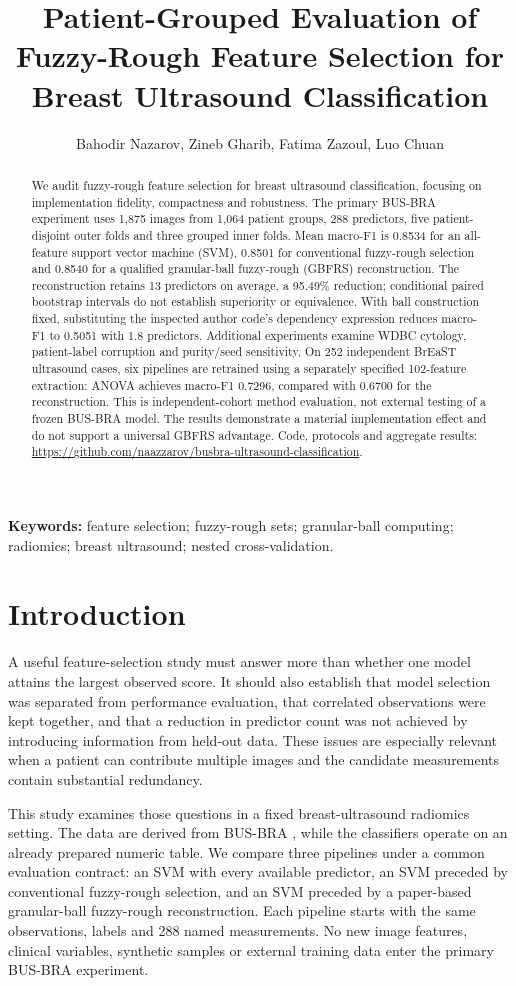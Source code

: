 \documentclass[11pt,a4paper]{article}
\title{Patient-Grouped Evaluation of Fuzzy-Rough Feature Selection for Breast Ultrasound Classification}
\author{Bahodir Nazarov, Zineb Gharib, Fatima Zazoul, Luo Chuan}
\date{}
\makeatletter
\renewcommand{\maketitle}{%
  \begingroup
    \centering
    {\fontsize{16}{19}\selectfont\bfseries\@title\par}
    \vspace{0.65em}
    {\normalsize\@author\par}
  \endgroup
  \vspace{0.2em}
}
\makeatother
\begin{document}
\maketitle
\begin{abstract}
We audit fuzzy-rough feature selection for breast ultrasound classification, focusing on implementation fidelity, compactness and robustness. The primary BUS-BRA experiment uses 1,875 images from 1,064 patient groups, 288 predictors, five patient-disjoint outer folds and three grouped inner folds. Mean macro-F1 is 0.8534 for an all-feature support vector machine (SVM), 0.8501 for conventional fuzzy-rough selection and 0.8540 for a qualified granular-ball fuzzy-rough (GBFRS) reconstruction. The reconstruction retains 13 predictors on average, a 95.49\% reduction; conditional paired bootstrap intervals do not establish superiority or equivalence. With ball construction fixed, substituting the inspected author code's dependency expression reduces macro-F1 to 0.5051 with 1.8 predictors. Additional experiments examine WDBC cytology, patient-label corruption and purity/seed sensitivity. On 252 independent BrEaST ultrasound cases, six pipelines are retrained using a separately specified 102-feature extraction: ANOVA achieves macro-F1 0.7296, compared with 0.6700 for the reconstruction. This is independent-cohort method evaluation, not external testing of a frozen BUS-BRA model. The results demonstrate a material implementation effect and do not support a universal GBFRS advantage. Code, protocols and aggregate results: \url{https://github.com/naazzarov/busbra-ultrasound-classification}.
\end{abstract}
\textbf{Keywords:} feature selection; fuzzy-rough sets; granular-ball computing; radiomics; breast ultrasound; nested cross-validation.

\section{Introduction}
A useful feature-selection study must answer more than whether one model attains the largest observed score. It should also establish that model selection was separated from performance evaluation, that correlated observations were kept together, and that a reduction in predictor count was not achieved by introducing information from held-out data. These issues are especially relevant when a patient can contribute multiple images and the candidate measurements contain substantial redundancy.

This study examines those questions in a fixed breast-ultrasound radiomics setting. The data are derived from BUS-BRA \cite{busbra}, while the classifiers operate on an already prepared numeric table. We compare three pipelines under a common evaluation contract: an SVM with every available predictor, an SVM preceded by conventional fuzzy-rough selection, and an SVM preceded by a paper-based granular-ball fuzzy-rough reconstruction. Each pipeline starts with the same observations, labels and 288 named measurements. No new image features, clinical variables, synthetic samples or external training data enter the primary BUS-BRA experiment.
\end{document}
